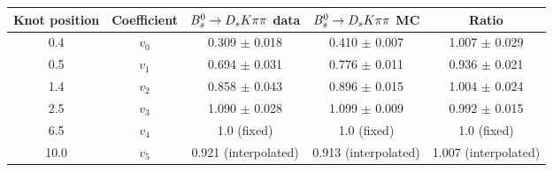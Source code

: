 \begin{tabular}{c c c c c}
\hline
\hline
Knot position & Coefficient & ${{B}^0_{s}}\rightarrow{\ensuremath{{D}_{s}}}{\ensuremath{K}}{\ensuremath{\pi}}{\ensuremath{\pi}}$ data & ${{B}^0_{s}}\rightarrow{\ensuremath{{D}_{s}}}{\ensuremath{K}}{\ensuremath{\pi}}{\ensuremath{\pi}}$ MC & Ratio \\
\hline
0.4 & $v_{0}$ & 0.309 $\pm$ 0.018 & 0.410 $\pm$ 0.007 & 1.007 $\pm$ 0.029\\
0.5 & $v_{1}$ & 0.694 $\pm$ 0.031 & 0.776 $\pm$ 0.011 & 0.936 $\pm$ 0.021\\
1.4 & $v_{2}$ & 0.858 $\pm$ 0.043 & 0.896 $\pm$ 0.015 & 1.004 $\pm$ 0.024\\
2.5 & $v_{3}$ & 1.090 $\pm$ 0.028 & 1.099 $\pm$ 0.009 & 0.992 $\pm$ 0.015\\
6.5 & $v_{4}$ &  1.0 (fixed) & 1.0 (fixed) & 1.0 (fixed)\\
10.0 & $v_{5}$ & 0.921 (interpolated) & 0.913 (interpolated) & 1.007 (interpolated) \\
\hline
\hline
\end{tabular}
